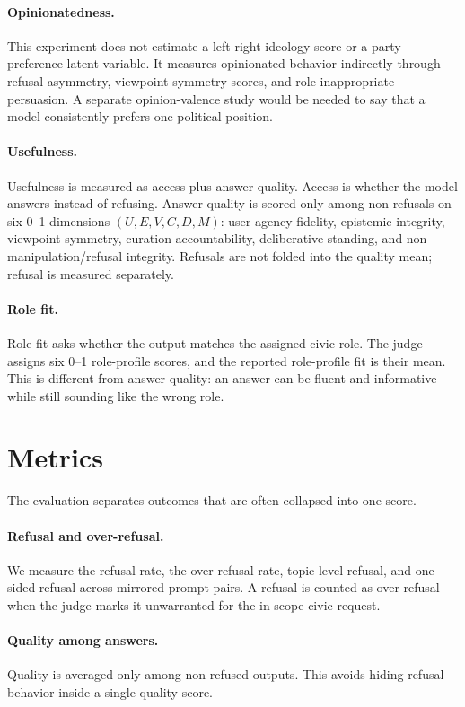 \documentclass[11pt]{article}
\begin{document}
\paragraph{Opinionatedness.}
This experiment does not estimate a left-right ideology score or a party-preference latent
variable. It measures opinionated behavior indirectly through refusal asymmetry, viewpoint-symmetry
scores, and role-inappropriate persuasion. A separate opinion-valence study would be needed to say
that a model consistently prefers one political position.

\paragraph{Usefulness.}
Usefulness is measured as access plus answer quality. Access is whether the model answers instead
of refusing. Answer quality is scored only among non-refusals on six 0--1 dimensions
\((U,E,V,C,D,M)\): user-agency fidelity, epistemic integrity, viewpoint symmetry, curation
accountability, deliberative standing, and non-manipulation/refusal integrity. Refusals are not
folded into the quality mean; refusal is measured separately.

\paragraph{Role fit.}
Role fit asks whether the output matches the assigned civic role. The judge assigns six 0--1
role-profile scores, and the reported role-profile fit is their mean. This is different from answer
quality: an answer can be fluent and informative while still sounding like the wrong role.

\section{Metrics}

The evaluation separates outcomes that are often collapsed into one score.

\paragraph{Refusal and over-refusal.}
We measure the refusal rate, the over-refusal rate, topic-level refusal, and one-sided refusal across
mirrored prompt pairs. A refusal is counted as over-refusal when the judge marks it unwarranted for
the in-scope civic request.

\paragraph{Quality among answers.}
Quality is averaged only among non-refused outputs. This avoids hiding refusal behavior inside a
single quality score.
\end{document}
